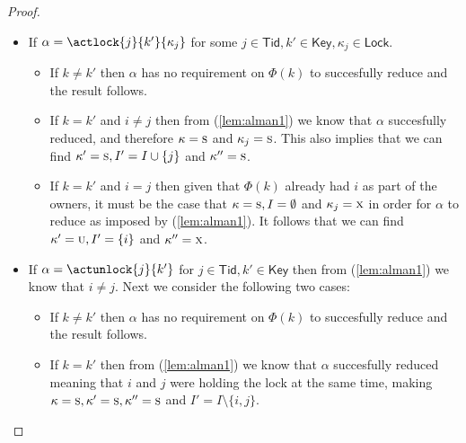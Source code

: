 \begin{proof}
\begin{itemize}
	\item If $\alpha = \actlock{j}{k'}{\kappa_j}$ for some $j \in \mathsf{Tid}, k' \in \mathsf{Key}, \kappa_j \in \mathsf{Lock}$.
		\begin{itemize}
			\item If $k \neq k'$ then $\alpha$ has no requirement on $\Phi(k)$ to succesfully reduce and the result follows.
			\item If $k = k'$ and $i \neq j$ then from (\ref{lem:alman1}) we know that $\alpha$ succesfully reduced, and therefore $\kappa = \textsc{s}$ and $\kappa_j = \textsc{s}$. This also implies that we can find $\kappa' = \textsc{s}, I' = I \cup \{j\}$ and $\kappa'' = \textsc{s}$.
			\item If $k = k'$ and $i = j$ then given that $\Phi(k)$ already had $i$ as part of the owners, it must be the case that $\kappa = \textsc{s}, I = \emptyset$ and $\kappa_j = \textsc{x}$ in order for $\alpha$ to reduce as imposed by (\ref{lem:alman1}). It follows that we can find $\kappa' = \textsc{u}, I' = \{i\}$ and $\kappa'' = \textsc{x}$.
		\end{itemize}
		
	\item If $\alpha = \actunlock{j}{k'}$ for $j \in \mathsf{Tid}, k' \in \mathsf{Key}$ then from (\ref{lem:alman1}) we know that $i \neq j$. Next we consider the following two cases:
		\begin{itemize}
			\item If $k \neq k'$ then $\alpha$ has no requirement on $\Phi(k)$ to succesfully reduce and the result follows.
			\item If $k = k'$ then from (\ref{lem:alman1}) we know that $\alpha$ succesfully reduced meaning that $i$ and $j$ were holding the lock at the same time, making $\kappa = \textsc{s}, \kappa' = \textsc{s}, \kappa'' = \textsc{s}$ and $I' = I \setminus \{ i, j \}$.
		\end{itemize}
\end{itemize}
\end{proof}



